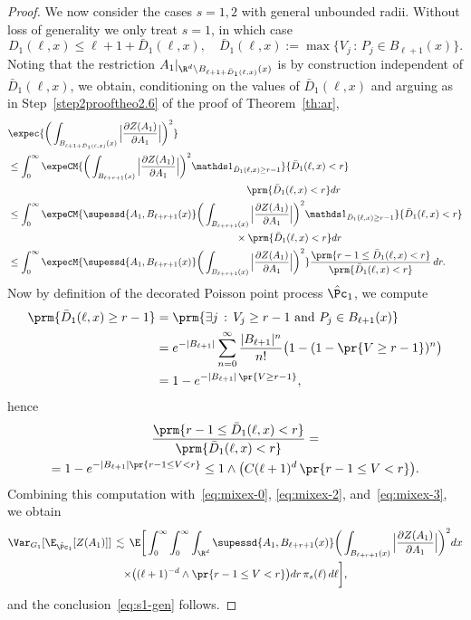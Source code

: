 \begin{proof}
\noindent We now consider the cases $s=1,2$ with general unbounded radii. Without loss of generality we only treat $s=1$, in which case
\[
D_1(\ell,x)\le\ell+1+\bar D_1(\ell,x),\quad \bar D_1(\ell,x):=\max\big\{V_j\,:\,P_j\in B_{\ell+1}(x)\big\}.
\]
Noting that the restriction $A_1|_{\R^d\setminus B_{\ell+1+\bar D_1(\ell,x)}(x)}$ is by construction independent of $\bar D_1(\ell,x)$, we obtain, conditioning on the values of $\bar D_1(\ell,x)$ and arguing as in Step~\ref{step2prooftheo2.6} of the proof of Theorem~\ref{th:ar},
\begin{equation}\label{eq:mixex-3}
\begin{aligned}
&\lefteqn{\expec{\bigg(\int_{B_{\ell+1+\bar D_1(\ell,x)}(x)}\Big|\frac{\partial Z(A_1)}{\partial A_1}\Big|\bigg)^2}}\\
&\le \int_0^\infty \expeCM{\bigg(\int_{B_{\ell+r+1}(x)}\Big|\frac{\partial Z(A_1)}{\partial A_1}\Big|\bigg)^2\mathds1_{\bar D_1(\ell,x)\ge r-1}}{\bar D_1(\ell,x)<r}\\
&\mkern430mu \prm{\bar D_1(\ell,x)<r}dr\\
&\le \int_0^\infty \expeCM{\supessd{A_1,B_{\ell+r+1}(x)}\bigg(\int_{B_{\ell+r+1}(x)}\Big|\frac{\partial Z(A_1)}{\partial A_1}\Big|\bigg)^2\mathds1_{\bar D_1(\ell,x)\ge r-1}}{\bar D_1(\ell,x)<r}\\
&\mkern410mu\times\prm{\bar D_1(\ell,x)<r}dr\\
&\le\int_0^\infty\expecM{\supessd{A_1,B_{\ell+r+1}(x)}\bigg(\int_{B_{\ell+r+1}(x)}\Big|\frac{\partial Z(A_1)}{\partial A_1}\Big|\bigg)^2}\frac{\prm{r-1\le\bar D_1(\ell,x)<r}}{\prm{\bar D_1(\ell,x)<r}}\,dr.
\end{aligned}
\end{equation}
Now by definition of the decorated Poisson point process $\hat\Pc_1$, we compute
\begin{align*}
\prm{\bar D_1(\ell,x)\ge r-1}&=\prm{\exists j \,:\, V_j\ge r-1\text{ and }P_j\in B_{\ell+1}(x)}\\
&=e^{-|B_{\ell+1}|}\sum_{n=0}^\infty \frac{|B_{\ell+1}|^n}{n!}\big(1-(1-\pr{V\ge r-1})^n\big)\\
&=1-e^{-|B_{\ell+1}|\,\pr{V\ge r-1}},
\end{align*}
hence
\begin{multline*}
\frac{\prm{r-1\le\bar D_1(\ell,x)<r}}{\prm{\bar D_1(\ell,x)<r}}=\\
=1-e^{-|B_{\ell+1}|\pr{r-1\le V<r}}\le 1\wedge\big(C(\ell+1)^d\,\pr{r-1\le V<r}\big).
\end{multline*}
Combining this computation with~\eqref{eq:mixex-0}, \eqref{eq:mixex-2}, and~\eqref{eq:mixex-3}, we obtain
\begin{multline*}
\Var_{G_1}[\E_{\hat\Pc_1}[Z(A_1)]]
\,\lesssim\, \E\bigg[\int_0^\infty\int_0^\infty\int_{\R^d}\supessd{A_1,B_{\ell+r+1}(x)}\bigg(\int_{B_{\ell+r+1}(x)}\Big|\frac{\partial Z(A_1)}{\partial A_1}\Big|\bigg)^2dx\\
\times\big((\ell+1)^{-d}\wedge\pr{r-1\le V<r}\big)dr\,\pi_s(\ell)\,d\ell\bigg],
\end{multline*}
and the conclusion~\eqref{eq:s1-gen} follows.


\end{proof}
